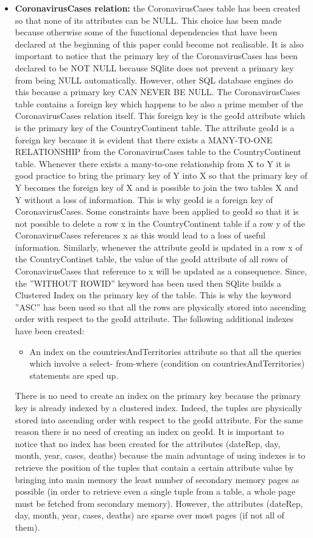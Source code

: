 \documentclass{article}
\begin{document}
\begin{itemize}
\item \textbf{CoronavirusCases relation:} the CoronavirusCases table has been created so that none of its attributes
can be NULL. This choice has been made because otherwise some of the functional dependencies that
have been declared at the beginning of this paper could become not realisable. It is also important to
notice that the primary key of the CoronavirusCases has been declared to be NOT NULL because SQlite
does not prevent a primary key from being NULL automatically. However, other SQL database engines do
this because a primary key CAN NEVER BE NULL. The CoronavirusCases table contains a foreign
key which happens to be also a prime member of the CoronavirusCases relation itself. This foreign key
is the geoId attribute which is the primary key of the CountryContinent table. The attribute geoId is
a foreign key because it is evident that there exists a MANY-TO-ONE RELATIONSHIP from the
CoronavirusCases table to the CountryContinent table. Whenever there exists a many-to-one relationship
from X to Y it is good practice to bring the primary key of Y into X so that the primary key of Y becomes
the foreign key of X and is possible to join the two tables X and Y without a loss of information. This is
why geoId is a foreign key of CoronavirusCases. Some constraints have been applied to geoId so that it is
not possible to delete a row x in the CountryContinent table if a row y of the CoronavirusCases references
x as this would lead to a loss of useful information. Similarly, whenever the attribute geoId is updated
in a row x of the CountryContinet table, the value of the geoId attribute of all rows of CoronavirusCases
that reference to x will be updated as a consequence.
Since, the ”WITHOUT ROWID” keyword has been used then SQlite builds a Clustered Index on the
primary key of the table. This is why the keyword ”ASC” has been used so that all the rows are physically
stored into ascending order with respect to the geoId attribute.
The following additional indexes have been created:
\begin{itemize}
    \item An index on the countriesAndTerritories attribute so that all the queries which involve a select-
from-where (condition on countriesAndTerritories) statements are sped up.
\end{itemize}
There is no need to create an index on the primary key because the primary key is already indexed by
a clustered index. Indeed, the tuples are physically stored into ascending order with respect to the geoId
attribute. For the same reason there is no need of creating an index on geoId. It is important to notice
that no index has been created for the attributes (dateRep, day, month, year, cases, deaths) because the main advantage
of using indexes is to retrieve the position of the tuples that contain a certain attribute value by bringing
into main memory the least number of secondary memory pages as possible (in order to retrieve even a
single tuple from a table, a whole page must be fetched from secondary memory). However, the attributes
(dateRep, day, month, year, cases, deaths) are sparse over most pages (if not all of them).



\end{itemize}
\end{document}
